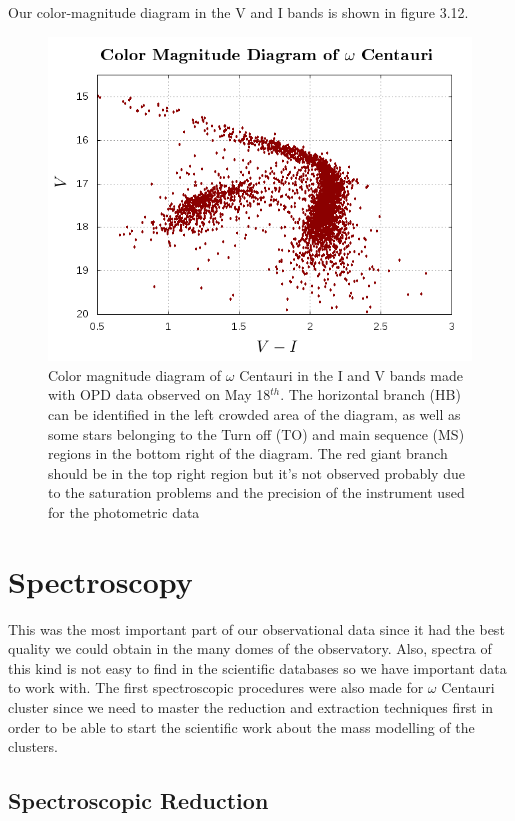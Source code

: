 Our color-magnitude diagram in the V and I bands is shown in figure 3.12.

\begin{figure}[H]
\centering
\includegraphics[width=12cm]{images/HR-diagram.png}
\caption[Pf]{Color magnitude diagram of $\omega$ Centauri in the I and V bands made with OPD data observed on May 18$^{th}$. The horizontal branch (HB) can be identified in the left crowded area of the diagram, as well as some stars belonging to the Turn off (TO) and main sequence (MS)  regions in the bottom right of the diagram. The red giant branch should be in the top right region but it's not observed probably due to the saturation problems and the precision of the instrument used for the photometric data}
\end{figure}


\section{Spectroscopy}

This was the most important part of our observational data since it had the best quality we could obtain in the many domes of the observatory. Also, spectra of this kind is not easy to find in the scientific databases so we have important data to work with. The first spectroscopic procedures were also made for $ \omega $ Centauri cluster since we need to master the reduction and extraction techniques first in order to be able to start the scientific work about the mass modelling of the clusters.

\subsection{Spectroscopic Reduction}

